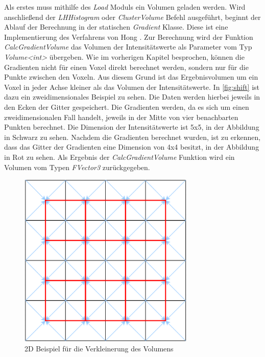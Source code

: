 Als erstes muss mithilfe des \textit{Load} Moduls ein Volumen geladen werden. Wird anschließend der \textit{LHHistogram} oder \textit{ClusterVolume} Befehl ausgeführt, beginnt der Ablauf der Berechnung in der statischen \textit{Gradient} Klasse.
Diese ist eine Implementierung des Verfahrens von Hong \cite{hong2003method}. Zur Berechnung wird der Funktion \textit{CalcGradientVolume} das Volumen der Intensitätswerte als Parameter vom Typ \textit{Volume<int>} übergeben. Wie im vorherigen Kapitel besprochen, können die Gradienten nicht für einen Voxel direkt berechnet werden, sondern nur für die Punkte zwischen den Voxeln. Aus diesem Grund ist das Ergebnisvolumen um ein Voxel in jeder Achse kleiner als das Volumen der Intensitätswerte.
\newline
In \autoref{fig:shift} ist dazu ein zweidimensionales Beispiel zu sehen. Die Daten werden hierbei jeweils in den Ecken der Gitter gespeichert. Die Gradienten werden, da es sich um einen zweidimensionalen Fall handelt, jeweils in der Mitte von vier benachbarten Punkten berechnet.
Die Dimension der Intensitätswerte ist 5x5, in der Abbildung in Schwarz zu sehen. Nachdem die Gradienten berechnet wurden, ist zu erkennen, dass das Gitter der Gradienten eine Dimension von 4x4 besitzt, in der Abbildung in Rot zu sehen.
Als Ergebnis der \textit{CalcGradientVolume} Funktion wird ein Volumen vom Typen \textit{FVector3} zurückgegeben.


\begin{figure}
\centering 
\includegraphics[width=0.75\textwidth]{Logos/VoxelShift.png}
\caption{2D Beispiel für die Verkleinerung des Volumens} 
\label{fig:shift} 
\end{figure}


